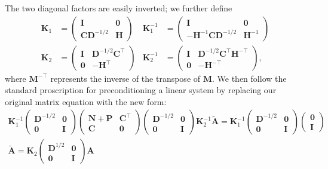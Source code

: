 The two diagonal factors are easily inverted; we further define
\begin{subequations}\begin{align}
\mathbf{K}_1 &=
\begin{pmatrix}
\mathbf{I} & \mathbf{0}\\
\mathbf{C} \mathbf{D}^{-1/2} & \mathbf{H}
\end{pmatrix}
&
\mathbf{K}_1^{-1} &=
\begin{pmatrix}
\mathbf{I} & \mathbf{0}\\
-\mathbf{H}^{-1}\mathbf{CD}^{-1/2} & \mathbf{H}^{-1}
\end{pmatrix}\\
\mathbf{K}_2 &=
\begin{pmatrix}
\mathbf{I} & \mathbf{D}^{-1/2}\mathbf{C}^\top\\
\mathbf{0} & -\mathbf{H}^\top
\end{pmatrix}
&
\mathbf{K}_2^{-1} &=
\begin{pmatrix}
\mathbf{I} & \mathbf{D}^{-1/2}\mathbf{C}^\top \mathbf{H}^{-\top}\\
\mathbf{0} & -\mathbf{H}^{-\top}
\end{pmatrix},
\end{align}\end{subequations}
where $\mathbf{M}^{-\top}$ represents the inverse of the transpose of $\mathbf{M}$.  We then follow the standard proscription for preconditioning a linear system by replacing our original matrix equation with the new form:
\begin{subequations}\begin{gather}
\mathbf{K}_1^{-1} \begin{pmatrix}\mathbf{D}^{-1/2}&\mathbf{0}\\ \mathbf{0}&\mathbf{I}\end{pmatrix}
\begin{pmatrix}
\mathbf{N}+\mathbf{P} & \mathbf{C}^\top \\
\mathbf{C} & \mathbf{0}
\end{pmatrix}
\begin{pmatrix}\mathbf{D}^{-1/2}&\mathbf{0}\\ \mathbf{0}&\mathbf{I}\end{pmatrix} \mathbf{K}_2^{-1} \mathbf{\widetilde{A}} = 
\mathbf{K}_1^{-1} \begin{pmatrix}\mathbf{D}^{-1/2}&\mathbf{0}\\\mathbf{0}&\mathbf{I}\end{pmatrix} \begin{pmatrix}\mathbf{0}\\ \mathbf{I}\end{pmatrix}\\
\mathbf{\widetilde{A}} = \mathbf{K}_2 \begin{pmatrix}\mathbf{D}^{1/2} & \mathbf{0}\\ \mathbf{0} & \mathbf{I}\end{pmatrix}\mathbf{A}
\end{gather}\end{subequations}
